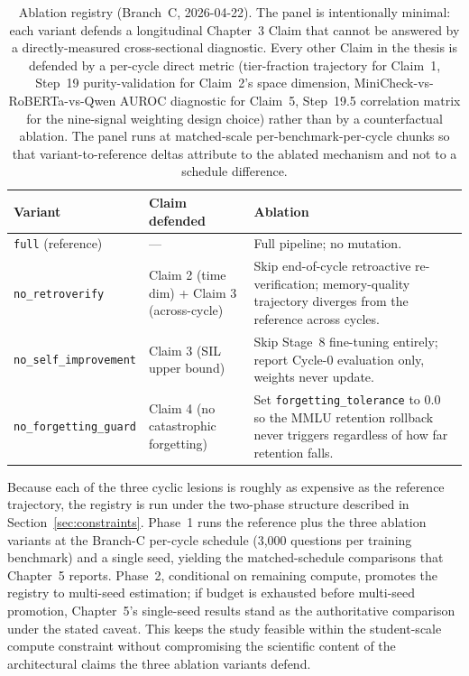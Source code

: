 \begin{table}[H]
\centering
\caption{Ablation registry (Branch~C, 2026-04-22). The panel is intentionally minimal: each variant defends a longitudinal Chapter~3 Claim that cannot be answered by a directly-measured cross-sectional diagnostic. Every other Claim in the thesis is defended by a per-cycle direct metric (tier-fraction trajectory for Claim~1, Step~19 purity-validation for Claim~2's space dimension, MiniCheck-vs-RoBERTa-vs-Qwen AUROC diagnostic for Claim~5, Step~19.5 correlation matrix for the nine-signal weighting design choice) rather than by a counterfactual ablation. The panel runs at matched-scale per-benchmark-per-cycle chunks so that variant-to-reference deltas attribute to the ablated mechanism and not to a schedule difference.}
\label{tab:ablation-registry}
\small
\begin{tabular}{@{}p{3.8cm}p{2.8cm}p{5.6cm}@{}}
\toprule
\textbf{Variant} & \textbf{Claim defended} & \textbf{Ablation} \\
\midrule
\texttt{full} (reference) & --- & Full pipeline; no mutation. \\
\addlinespace[2pt]
\texttt{no\_retroverify} & Claim 2 (time dim) + Claim 3 (across-cycle) & Skip end-of-cycle retroactive re-verification; memory-quality trajectory diverges from the reference across cycles. \\
\addlinespace[2pt]
\texttt{no\_self\_improvement} & Claim 3 (SIL upper bound) & Skip Stage~8 fine-tuning entirely; report Cycle-0 evaluation only, weights never update. \\
\addlinespace[2pt]
\texttt{no\_forgetting\_guard} & Claim 4 (no catastrophic forgetting) & Set \texttt{forgetting\_tolerance} to $0.0$ so the MMLU retention rollback never triggers regardless of how far retention falls. \\
\bottomrule
\end{tabular}
\end{table}

Because each of the three cyclic lesions is roughly as expensive as the reference trajectory, the registry is run under the two-phase structure described in Section~\ref{sec:constraints}. Phase~1 runs the reference plus the three ablation variants at the Branch-C per-cycle schedule (3{,}000 questions per training benchmark) and a single seed, yielding the matched-schedule comparisons that Chapter~5 reports. Phase~2, conditional on remaining compute, promotes the registry to multi-seed estimation; if budget is exhausted before multi-seed promotion, Chapter~5's single-seed results stand as the authoritative comparison under the stated caveat. This keeps the study feasible within the student-scale compute constraint without compromising the scientific content of the architectural claims the three ablation variants defend.

